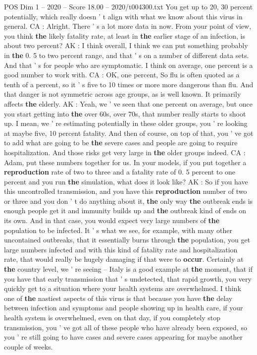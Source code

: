 \begin{textsample}{POS Dim 1 – 2020 – Score 18.00 – 2020/t004300.txt}
You get up to 20, 30 percent potentially, which really doesn ' t align with what we know about this virus in general.
CA : Alright.
There ' s a lot more data in now.
From your point of view, you think \textbf{the} likely fatality rate, at least in \textbf{the} earlier stage of an infection, is about two percent?
AK : I think overall, I think we can put something probably in \textbf{the} 0. 5 to two percent range, and that ' s on a number of different data sets.
And that ' s for people who are symptomatic.
I think on average, one percent is a good number to work with.
CA : OK, one percent, So flu is often quoted as a tenth of a percent, so it ' s five to 10 times or more more dangerous than flu.
And that danger is not symmetric across age groups, as is well known.
It primarily affects \textbf{the} elderly.
AK : Yeah, we ' ve seen that one percent on average, but once you start getting into \textbf{the} over 60s, over 70s, that number really starts to shoot up.
I mean, we ' re estimating potentially in these older groups, you ' re looking at maybe five, 10 percent fatality.
And then of course, on top of that, you ' ve got to add what are going to be \textbf{the} severe cases and people are going to require hospitalization.
And those risks get very large in \textbf{the} older groups indeed.
CA : Adam, put these numbers together for us.
In your models, if you put together a \textbf{reproduction} rate of two to three and a fatality rate of 0. 5 percent to one percent and you run \textbf{the} simulation, what does it look like?
AK : So if you have this uncontrolled transmission, and you have this \textbf{reproduction} number of two or three and you don ' t do anything about it, \textbf{the} only way \textbf{the} outbreak ends is enough people get it and immunity builds up and \textbf{the} outbreak kind of ends on its own.
And in that case, you would expect very large numbers of \textbf{the} population to be infected.
It ' s what we see, for example, with many other uncontained outbreaks, that it essentially burns through \textbf{the} population, you get large numbers infected and with this kind of fatality rate and hospitalization rate, that would really be hugely damaging if that were to \textbf{occur}.
Certainly at \textbf{the} country level, we ' re seeing -- Italy is a good example at \textbf{the} moment, that if you have that early transmission that ' s undetected, that rapid growth, you very quickly get to a situation where your health systems are overwhelmed.
I think one of \textbf{the} nastiest aspects of this virus is that because you have \textbf{the} delay between infection and symptoms and people showing up in health care, if your health system is overwhelmed, even on that day, if you completely stop transmission, you ' ve got all of these people who have already been exposed, so you ' re still going to have cases and severe cases appearing for maybe another couple of weeks.

\end{textsample}
